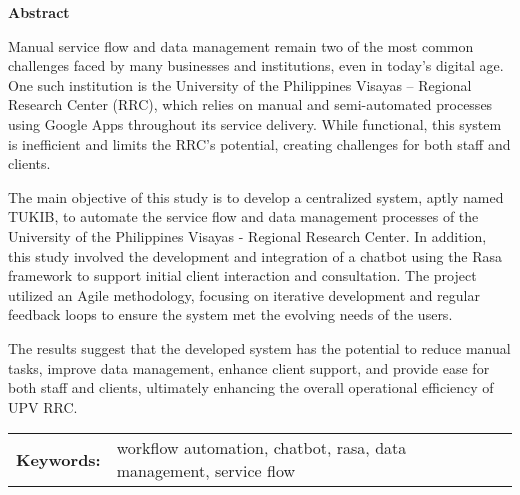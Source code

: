 \begin{center}
\textbf{Abstract}
\end{center}
\setlength{\parindent}{0pt}
Manual service flow and data management remain two of the most common challenges faced by many businesses and institutions, even in today’s digital age. One such institution is the University of the Philippines Visayas – Regional Research Center (RRC), which relies on manual and semi-automated processes using Google Apps throughout its service delivery. While functional, this system is inefficient and limits the RRC’s potential, creating challenges for both staff and clients.

The main objective of this study is to develop a centralized system, aptly named TUKIB, to automate the service flow and data management processes of the University of the Philippines Visayas - Regional Research Center. In addition, this study involved the development and integration of a chatbot using the Rasa framework to support initial client interaction and consultation. The project utilized an Agile methodology, focusing on iterative development and regular feedback loops to ensure the system met the evolving needs of the users. 

The results suggest that the developed system has the potential to reduce manual tasks, improve data management, enhance client support, and provide ease for both staff and clients, ultimately enhancing the overall operational efficiency of UPV RRC.

\begin{tabular}{lp{4.25in}}
\hspace{-0.5em}\textbf{Keywords:}\hspace{0.25em} & workflow automation, chatbot, rasa, data management, service flow\\
\end{tabular}